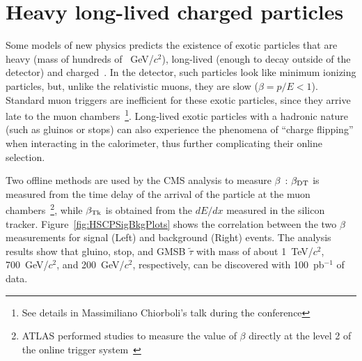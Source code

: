 \documentclass{cimento}
\begin{document}
\section{Heavy long-lived charged particles} \label{HSCP}
Some models of new physics predicts the existence 
of exotic particles that are heavy (mass of hundreds of ~GeV/$c^2$), 
long-lived (enough to decay outside of the detector) and charged~\cite{Fairbairn:2006gg}. 
In the detector, such particles look like 
minimum ionizing particles, but, unlike the 
relativistic muons, they are slow ($\beta=p/E<1$). 
Standard muon triggers are inefficient for these exotic particles, 
since they arrive late to the muon chambers~\footnote{See details 
in Massimiliano Chiorboli's talk during the conference}. 
Long-lived exotic particles with a hadronic nature (such as gluinos or stops) 
can also experience the phenomena of ``charge flipping'' when interacting 
in the calorimeter, thus further complicating their online selection.

Two offline methods are used by the 
CMS analysis to measure $\beta$~\cite{HSCP}:
$\beta_{{\rm DT}}$ is measured from the time delay of the arrival of the particle
at the muon chambers~\footnote{ATLAS performed studies to measure 
the value of $\beta$ directly at the level 2 of the online 
trigger system~\cite{Aad:2009wy}}, while $\beta_{{\rm Tk}}$ 
is obtained from the $dE/dx$ measured in the silicon tracker. 
Figure~\ref{fig:HSCPSigBkgPlots} shows the correlation between 
the two $\beta$ measurements for signal (Left) 
and background (Right) events. The analysis results show that 
gluino, stop, and GMSB $\tilde{\tau}$  with mass of about 
1~TeV/$c^2$, 700~GeV/$c^2$, and 200~GeV/$c^2$, 
respectively, can be discovered with 100~pb$^{-1}$ of data.
\end{document}
